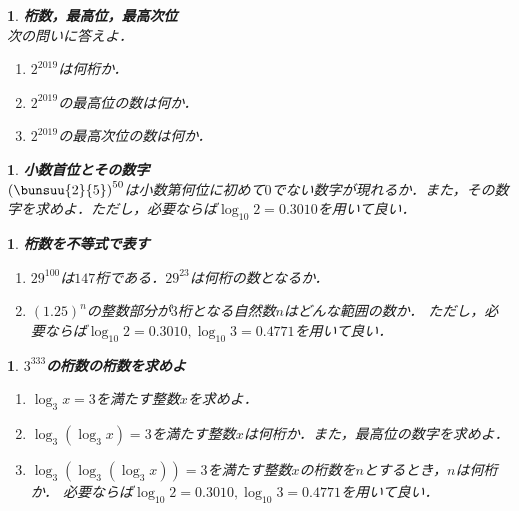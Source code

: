 \documentclass[10pt,
fleqn,
dvipdfmx,
uplatex
]{jsarticle}
\newtheorem{question}[Question]{}
\begin{document}
\begin{question}{\bf\boldmath 桁数，最高位，最高次位}\\
次の問いに答えよ．
\begin{enumerate}
\item $2^{{2019}}$は何桁か．
\item $2^{{2019}}$の最高位の数は何か．
\item $2^{{2019}}$の最高次位の数は何か．
\end{enumerate}

\end{question}



\begin{question}{\bf\boldmath 小数首位とその数字}\\
$\left(\bunsuu{2}{5}\right)^{50}$は小数第何位に初めて$0$でない数字が現れるか．また，その数字を求めよ．ただし，必要ならば$\log _{10}2=0.{3010}$を用いて良い．
\end{question}



\begin{question}{\bf\boldmath 桁数を不等式で表す}\\

\begin{enumerate}
\item ${29}^{100}$は${147}$桁である．${29}^{23}$は何桁の数となるか．
\item $\left(1.{25}\right)^n$の整数部分が$3$桁となる自然数$n$はどんな範囲の数か．
ただし，必要ならば$\log _{10}2=0.{3010}, \log _{10}3=0.{4771}$を用いて良い．
\end{enumerate}

\end{question}



\begin{question}{\bf\boldmath $3^{333}$の桁数の桁数を求めよ}\\

\begin{enumerate}
\item $\log _3x=3$を満たす整数$x$を求めよ．
\item $\log _3\left(\log _3x\right)=3$を満たす整数$x$は何桁か．また，最高位の数字を求めよ．
\item $\log _3\left(\log _3\left(\log _3x\right)\right)=3$を満たす整数$x$の桁数を$n$とするとき，$n$は何桁か．
必要ならば$\log _{10}2=0.{3010}, \log _{10}3=0.{4771}$を用いて良い．
\end{enumerate}

\end{question}
\end{document}
